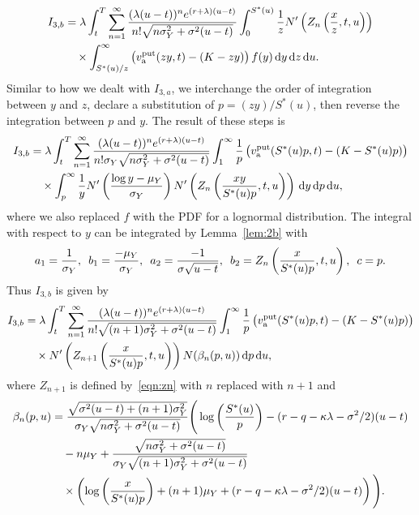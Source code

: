 		\begin{align*}
			I_{3,b} &= \lambda \int_t^T \displaystyle\sum\limits_{n=1}^{\infty} \frac{(\lambda(u-t))^ne^{(r+\lambda)(u-t)}}{n!\sqrt{n\sigma_Y^2 + \sigma^2(u-t)}}\int_0^{S^*(u)} \frac{1}{z}  N'\left( Z_n\left( \frac{x}{z},t, u \right) \right) \\
			&\quad {} \times \int_{S^*(u)/z}^\infty \left( v_{\text{a}}^{\text{put}}(zy,t) - (K-zy) \right) f(y) \, \mathrm d y  \, \mathrm d z \, \mathrm d u.
		\end{align*}
		Similar to how we dealt with $I_{3,a}$, we interchange the order of integration between $y$ and $z$, declare a substitution of $p = (zy)/S^*(u)$, then reverse the integration between $p$ and $y$. The result of these steps is
		\begin{align*}
			I_{3,b} &= \lambda \int_t^T \displaystyle\sum\limits_{n=1}^{\infty} \frac{(\lambda(u-t))^ne^{(r+\lambda)(u-t)}}{n!\sigma_Y\sqrt{n\sigma_Y^2 + \sigma^2(u-t)}}\int_1^\infty \frac{1}{p}\left( v_{\text{a}}^{\text{put}}(S^*(u)p,t) - (K-S^*(u)p) \right) \\
			&\quad {} \times \int_p^\infty \frac{1}{y} N'\left( \frac{\log y - \mu_Y}{\sigma_Y} \right) N'\left( Z_n\left( \frac{xy}{S^*(u)p}, t, u \right) \right)\, \mathrm d y  \, \mathrm d p \, \mathrm d u,
		\end{align*}
		where we also replaced $f$ with the PDF for a lognormal distribution. The integral with respect to $y$ can be integrated by Lemma~\ref{lem:2b} with
		$$
			a_1 = \frac{1}{\sigma_Y}, \enskip b_1 = \frac{-\mu_Y}{\sigma_Y}, \enskip a_2 = \frac{-1}{\sigma\sqrt{u-t}}, \enskip
			b_2 = Z_n\left( \frac{x}{S^*(u)p}, t, u \right), \enskip c = p.
		$$
		Thus $I_{3,b}$ is given by
		\begin{align*}
			I_{3,b} &= \lambda \int_t^T \displaystyle\sum\limits_{n=1}^{\infty} \frac{(\lambda(u-t))^ne^{(r+\lambda)(u-t)}}{n!\sqrt{(n+1)\sigma_Y^2 + \sigma^2(u-t)}}\int_1^\infty \frac{1}{p}\left( v_{\text{a}}^{\text{put}}(S^*(u)p,t) - (K-S^*(u)p) \right) \\
			&\quad {} \times N'\left( Z_{n+1}\left( \frac{x}{S^*(u)p}, t, u \right)\right)N(\beta_n(p,u))  \, \mathrm d p \, \mathrm d u,
		\end{align*}
		where $Z_{n+1}$ is defined by~\eqref{eqn:zn} with $n$ replaced with $n+1$ and
		\begin{equation}
			\label{eqn:betan}
			\begin{split}
			\beta_n(p,u) &= \frac{\sqrt{\sigma^2(u-t) + (n+1)\sigma_Y^2}}{\sigma_Y\sqrt{n\sigma_Y^2 + \sigma^2(u-t)}}\Bigg( \log\left(\frac{S^*(u)}{p}\right) - (r-q-\kappa\lambda-\sigma^2/2)(u-t) \\
			&\quad {}  - n\mu_Y + \frac{\sqrt{n\sigma_Y^2 + \sigma^2(u-t)}}{\sigma_Y\sqrt{(n+1)\sigma_Y^2 + \sigma^2(u-t)}} \\ 
			&\quad {} \times \left(\log\left(\frac{x}{S^*(u)p}\right) + (n+1)\mu_Y + (r-q-\kappa\lambda - \sigma^2/2)(u-t)\right) \Bigg).
			\end{split}
		\end{equation}
